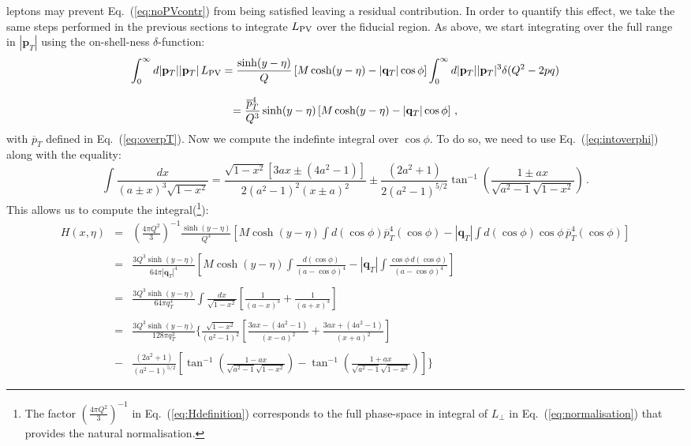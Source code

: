 \documentclass[10pt,a4paper]{article}
\begin{document}
leptons may prevent Eq.~(\ref{eq:noPVcontr}) from being satisfied
leaving a residual contribution. In order to quantify this effect, we
take the same steps performed in the previous sections to integrate
$L_{\rm PV}$ over the fiducial region. As above, we start integrating
over the full range in $|\mathbf{p}_T|$ using the on-shell-ness
$\delta$-function:
\begin{equation}
\begin{array}{c}
\displaystyle \int_0^\infty d|\mathbf{p}_T||\mathbf{p}_T|\,L_{\rm PV}=\frac{\sinh(y-\eta)}{Q}\left[M\cosh(y-\eta)-|\mathbf{q}_T|\cos\phi\right]
\int_0^\infty d|\mathbf{p}_T||\mathbf{p}_T|^3\delta(Q^2-2pq)\\
\\
\displaystyle = \frac{\overline{p}_T^4}{Q^3}\sinh(y-\eta)\left[M\cosh(y-\eta)-|\mathbf{q}_T|\cos\phi\right]\,,
\end{array}
\end{equation}
with $\overline{p}_T$ defined in Eq.~(\ref{eq:overpT}). Now we compute
the indefinte integral over $\cos\phi$. To do so, we need to use
Eq.~(\ref{eq:intoverphi}) along with the equality:
\begin{equation}\label{eq:complicatedintegral3}
\int \frac{dx}{(a\pm
  x)^3\sqrt{1-x^2}}=\frac{\sqrt{1-x^2}\left[3ax\pm(4a^2-1) \right]}{2(a^2-1)^2(x\pm
  a)^2}\pm\displaystyle\frac{(2a^2+1)}{2(a^2-1)^{5/2}}\tan^{-1}\left(\frac{1\pm
      ax}{\sqrt{a^2-1}\sqrt{1-x^2}}\right)\,.
\end{equation}
This allows us to compute the integral(\footnote{The factor
  $\left(\frac {4\pi Q^2}{3}\right)^{-1}$ in
  Eq.~(\ref{eq:Hdefinition}) corresponds to the full phase-space in
  integral of $L_\perp$ in Eq.~(\ref{eq:normalisation}) that provides
  the natural normalisation.}):
\begin{equation}\label{eq:Hdefinition}
\begin{array}{rcl}
\displaystyle H(x,\eta)&=&\displaystyle\left(\frac {4\pi Q^2}{3}\right)^{-1}\frac{\sinh(y-\eta)}{Q^3}\left[M\cosh(y-\eta) \int
  d(\cos\phi)\overline{p}_T^4(\cos\phi)- |\mathbf{q}_T|
  \int d(\cos\phi) \cos\phi\,\overline{p}_T^4(\cos\phi)\right]\\
\\
&=&\displaystyle\frac{3Q^3 \sinh(y-\eta)}{64\pi |\mathbf{q}_T|^4}\left[M\cosh(y-\eta) \int
  \frac{d(\cos\phi)}{\left(a-\cos\phi\right)^4}-|\mathbf{q}_T|\int
  \frac{\cos\phi \,d(\cos\phi)}{\left(a-\cos\phi\right)^4}\right]\\
\\
&=&\displaystyle\frac{3Q^3 \sinh(y-\eta)}{64\pi q_T^3} \int
  \frac{dx}{\sqrt{1-x^2}}\left[\frac{1}{(a-x)^3}+\frac{1}{(a+x)^3}\right]\\
\\
&=&\displaystyle\frac{3Q^3 \sinh(y-\eta)}{128\pi q_T^3}\Bigg\{\frac{\sqrt{1-x^2}}{(a^2-1)^2}\left[\frac{3ax-(4a^2-1) }{(x-
  a)^2}+\frac{3ax+(4a^2-1) }{(x+
  a)^2}\right]\\
\\
&-&\displaystyle\frac{(2a^2+1)}{(a^2-1)^{5/2}}\left[\tan^{-1}\left(\frac{1-
      ax}{\sqrt{a^2-1}\sqrt{1-x^2}}\right) -\tan^{-1}\left(\frac{1+
      ax}{\sqrt{a^2-1}\sqrt{1-x^2}}\right)\right]\Bigg\}
\end{array}
\end{equation}
\end{document}
